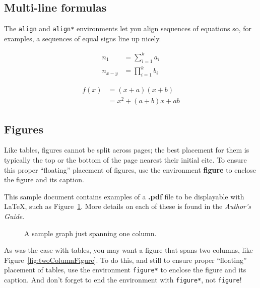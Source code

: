 \documentclass{sig-alternate}
\begin{document}
\subsection{Multi-line formulas}
\label{sec:multiLineFormulas}

The \texttt{align} and \texttt{align*} environments let you align sequences of
equations so, for examples, a sequences of equal signs line up nicely. 

\begin{align*}
n_1 &= \sum_{i = 1}^k a_i \\
n_{x-y} &= \prod_{i = 1}^k b_i
\end{align*}

\begin{align*}
 f(x) &= (x+a)(x+b) \\
 &= x^2 + (a+b)x + ab
\end{align*}

\subsection{Figures}
\label{sec:figures}

Like tables, figures cannot be split across pages; the
best placement for them
is typically the top or the bottom of the page nearest
their initial cite.  To ensure this proper ``floating'' placement
of figures, use the environment
\textbf{figure} to enclose the figure and its caption.

This sample document contains examples of
a \textbf{.pdf} file to be displayable with \LaTeX, such as
Figure~\ref{fig:singleColumnFigure}.  More
details on each of these is found in the \textit{Author's Guide}.

\begin{figure}
\centering
{}
\caption{A sample graph just spanning one column.}
\label{fig:singleColumnFigure}
\end{figure}


As was the case with tables, you may want a figure
that spans two columns, like Figure~\ref{fig:twoColumnFigure}.  
To do this, and still to
ensure proper ``floating'' placement of tables, use the environment
\texttt{figure*} to enclose the figure and its caption.
And don't forget to end the environment with
\texttt{figure*}, not \texttt{figure}!

\begin{figure*}
\centering
{}
\caption{A sample graph that needs to span two columns of text.}
\label{fig:twoColumnFigure}
\end{figure*}
\end{document}
